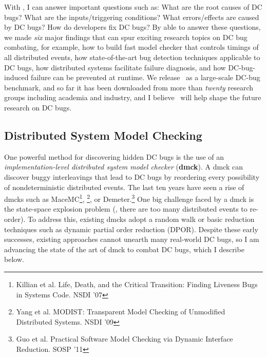 \documentclass[10pt]{article}
\begin{document}
With \taxdc, I can answer important questions such as: 
%
What are the root causes of DC bugs?
%
What are the inputs/triggering conditions? 
%
What errors/effects are caused by DC bugs?
%
How do developers fix DC bugs? 
%
By able to answer these questions, we made \textit{six} major findings that can
spur exciting research topics on DC bug combating, for example, 
%
how to build fast model checker that controls timings of all distributed events, 
%
how state-of-the-art bug detection techniques applicable to DC bugs, 
%
how distributed systems facilitate failure diagnosis, 
%
and how DC-bug-induced failure can be prevented at runtime.
%
We release \taxdc\ as a large-scale DC-bug benchmark, and so far it has been
downloaded from more than \textit{twenty} research groups including academia
and industry, and I believe \taxdc\ will help shape the future research on DC
bugs.



\subsection{Distributed System Model Checking}

One powerful method for discovering hidden DC bugs is the use of an
\textit{implementation-level distributed system model checker} (\textbf{dmck}).
A dmck can discover buggy interleavings that lead to DC bugs by reordering
every possibility of nondeterministic distributed events. The last ten years
have seen a rise of dmcks such as 
%
MaceMC\footnote{Killian et al.
Life, Death, and the Critical Transition: Finding Liveness Bugs
in Systems Code. NSDI '07}, 
%
\modist\footnote{Yang et al.
MODIST: Transparent Model Checking of Unmodified Distributed
Systems. NSDI '09}, or Demeter.\footnote{Guo et al.
Practical Software Model Checking via
Dynamic Interface Reduction. SOSP '11} One big challenge faced by a dmck is the
state-space explosion problem (\ie, there are too many distributed events to
re-order). To address this, existing dmcks adopt a random walk or basic
reduction techniques such as dynamic partial order reduction (DPOR). Despite
these early successes, existing approaches cannot unearth many real-world DC
bugs, so I am advancing the state of the art of dmck to combat DC bugs, which I
describe below.
\end{document}
